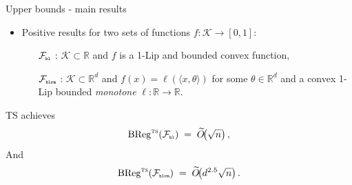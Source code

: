 \documentclass{beamer}
\newcommand{\BReg}{\operatorname{BReg}}
\newcommand{\R}{\mathbb{R}}
\newcommand{\cK}{\mathcal{K}}
\newcommand{\cF}{\mathcal{F}}
\newcommand{\ts}{{\textsc{ts}}}
\newcommand{\pr}{\text{\tiny\texttt{r}}}
\newcommand{\pb}{\text{\tiny\texttt{b}}}
\newcommand{\pl}{\text{\tiny\texttt{l}}}
\renewcommand{\pm}{\text{\tiny\texttt{m}}}
\begin{document}
\begin{frame}{Upper bounds - main results}
    \begin{itemize}
        \item Positive results for two sets of functions $f:\cK \to [0,1]$:\vspace{1em}
              \begin{enumerate}
                  \large
                  \setlength{\itemsep}{1em} %
                  \item[$\cF_{\pb\pl}$]: $\cK \subset \R$ and $f$ is a 1-Lip and bounded convex function,
                  \item[$\cF_{\pb\pl\pr\pm}$] : $\cK \subset \R^d$ and $f(x) = \ell(\langle x, \theta\rangle)$ for some $\theta\in\R^d$ and a convex 1-Lip bounded \emph{monotone} $\ell: \R \to \R$.
              \end{enumerate}
    \end{itemize}
    \begin{tcolorbox}[title=Upper bounds -- 1-D convex functions,colback=blue!5!white,colframe=blue!50!black]
        TS achieves
        \[
            \BReg^{\ts}(\cF_{\pb\pl})\;=\; \widetilde{O}\!\bigl(\sqrt{n}\bigr)\,,
        \]
        And
        \[
            \BReg^{\ts}(\cF_{\pb\pl\pr\pm})\;=\; \widetilde{O}\!\bigl(d^{2.5}\sqrt{n}\bigr)\,.
        \]
    \end{tcolorbox}
\end{frame}

\end{document}
